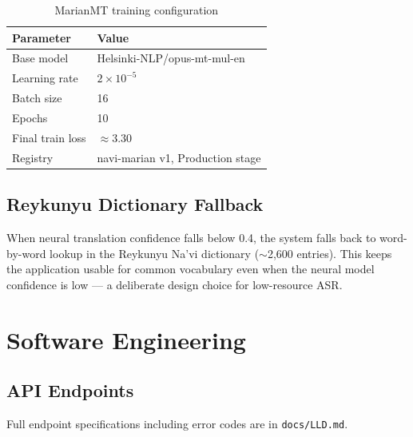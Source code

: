 \documentclass[12pt,a4paper]{article}
\begin{document}
\begin{table}[H]
  \centering
  \caption{MarianMT training configuration}
  \begin{tabular}{@{}L{4cm}L{10cm}@{}}
    \toprule
    \textbf{Parameter} & \textbf{Value} \\
    \midrule
    Base model    & Helsinki-NLP/opus-mt-mul-en \\
    Learning rate & $2 \times 10^{-5}$ \\
    Batch size    & 16 \\
    Epochs        & 10 \\
    Final train loss & $\approx 3.30$ \\
    Registry      & navi-marian v1, Production stage \\
    \bottomrule
  \end{tabular}
\end{table}

\subsection{Reykunyu Dictionary Fallback}

When neural translation confidence falls below 0.4, the system falls back to
word-by-word lookup in the Reykunyu Na'vi dictionary ($\sim$2,600 entries). This
keeps the application usable for common vocabulary even when the neural model
confidence is low --- a deliberate design choice for low-resource ASR.

\section{Software Engineering}

\subsection{API Endpoints}

Full endpoint specifications including error codes are in \texttt{docs/LLD.md}.
\end{document}
